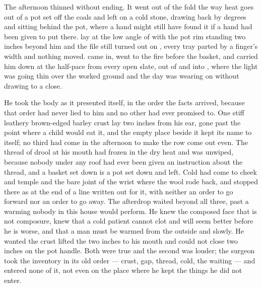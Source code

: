 The afternoon thinned without ending. It went out of the fold the way heat goes out of a pot set off the coals and left on a cold stone, drawing back by degrees and sitting behind the pot, where a hand might still have found it if a hand had been given to put there.  lay at the low angle of  with the pot rim standing two inches beyond him and the file still turned out on , every tray parted by a finger's width and nothing moved.  came in, went to the fire before the basket, and carried him down at the half-pace from every open slate, out of  and into , where the light was going thin over the worked ground and the day was wearing on without drawing to a close.

He took the body as it presented itself, in the order the facts arrived, because that order had never lied to him and no other had ever promised to. One stiff leathery brown-edged barley crust lay two inches from his ear, gone past the point where a child would eat it, and the empty place beside it kept its name to itself; no third had come in the afternoon to make the row come out even. The thread of drool at his mouth had frozen in the dry heat and was unwiped, because nobody under any roof had ever been given an instruction about the thread, and a basket set down is a pot set down and left. Cold had come to cheek and temple and the bare joint of the wrist where the wool rode back, and stopped there as at the end of a line written out for it, with neither an order to go forward nor an order to go away. The afterdrop waited beyond all three, past a warming nobody in this house would perform. He knew the composed face that is not composure, knew that a cold patient cannot clot and will seem better before he is worse, and that a man must be warmed from the outside and slowly. He wanted the crust lifted the two inches to his mouth and could not close two inches on the pot handle. Both were true and the second was louder; the surgeon took the inventory in its old order --- crust, gap, thread, cold, the waiting --- and entered none of it, not even on the place where he kept the things he did not enter.

\scenebreak

